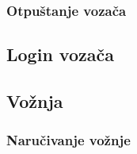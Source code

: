 \subsubsection{\bfseries Otpuštanje vozača}


\subsection{\bfseries Login vozača}

\subsection{\bfseries Vo\v znja}

\subsubsection{\bfseries Naru\v civanje vo\v znje}
